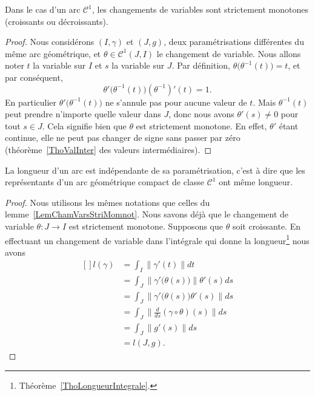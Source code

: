 \begin{lemma}       \label{LemChamVarsStriMomnot}
Dans le cas d'un arc $\mathcal{C}^1$, les changements de variables sont strictement monotones (croissants ou décroissants).
\end{lemma}

\begin{proof}
Nous considérons $(I,\gamma)$ et $(J,g)$, deux paramétrisations différentes du même arc géométrique, et $\theta\in \mathcal{C}^1(J,I)$ le changement de variable. Nous allons noter $t$ la variable sur $I$ et $s$ la variable sur $J$. Par définition, $\theta\big( \theta^{-1}(t) \big)=t$, et par conséquent,
\begin{equation}
    \theta'\big( \theta^{-1}(t) \big)(\theta^{-1})'(t)=1.
\end{equation}
En particulier $\theta'\big( \theta^{-1}(t) \big)$ ne s'annule pas pour aucune valeur de $t$. Mais $\theta^{-1}(t)$ peut prendre n'importe quelle valeur dans $J$, donc nous avons $\theta'(s)\neq 0$ pour tout $s\in J$. Cela signifie bien que $\theta$ est strictement monotone. En effet, $\theta'$ étant continue, elle ne peut pas changer de signe sans passer par zéro (théorème~\ref{ThoValInter} des valeurs intermédiaires).
\end{proof}

\begin{theorem}     \label{ThoLongArcGeom}
La longueur d'un arc est indépendante de sa paramétrisation, c'est à dire que les représentants d'un arc géométrique compact de classe $\mathcal{C}^1$ ont même longueur.
\end{theorem}

\begin{proof}
Nous utilisons les mêmes notations que celles du lemme~\ref{LemChamVarsStriMomnot}. Nous savons déjà que le changement de variable $\theta \colon J\to I$ est strictement monotone. Supposons que $\theta$ soit croissante.
En effectuant un changement de variable dans l'intégrale qui donne la longueur\footnote{Théorème~\ref{ThoLongueurIntegrale}.} nous avons
\begin{equation}
    \begin{aligned}[]
        l(\gamma)&=\int_I\| \gamma'(t) \|dt\\
            &=\int_J\| \gamma'\big( \theta(s) \big) \|\theta'(s)ds\\
            &=\int_J\| \gamma'\big( \theta(s) \big)\theta'(s) \|ds\\
            &=\int_J\| \frac{ d }{ ds }(\gamma\circ\theta)(s) \|ds\\
            &=\int_J\| g'(s) \|ds\\
            &=l(J,g).
    \end{aligned}
\end{equation}
\end{proof}

